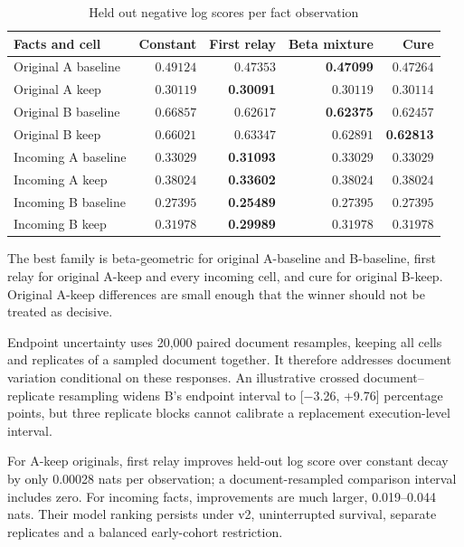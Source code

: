 \documentclass[10pt,letterpaper]{amsart}
\numberwithin{equation}{section}
\begin{document}
\begin{table}[!htbp]
  \centering
  \small
  \caption{Held out negative log scores per fact observation}
  \label{tab:predictive-comparison}
  \begin{tabular}{@{}lrrrr@{}}
    \toprule
    \textbf{Facts and cell} & \textbf{Constant} & \textbf{First relay} & \textbf{Beta mixture} & \textbf{Cure} \\
    \midrule
    Original A baseline & $0.49124$ & $0.47353$ & \textbf{0.47099} & $0.47264$ \\
    Original A keep & $0.30119$ & \textbf{0.30091} & $0.30119$ & $0.30114$ \\
    Original B baseline & $0.66857$ & $0.62617$ & \textbf{0.62375} & $0.62457$ \\
    Original B keep & $0.66021$ & $0.63347$ & $0.62891$ & \textbf{0.62813} \\
    Incoming A baseline & $0.33029$ & \textbf{0.31093} & $0.33029$ & $0.33029$ \\
    Incoming A keep & $0.38024$ & \textbf{0.33602} & $0.38024$ & $0.38024$ \\
    Incoming B baseline & $0.27395$ & \textbf{0.25489} & $0.27395$ & $0.27395$ \\
    Incoming B keep & $0.31978$ & \textbf{0.29989} & $0.31978$ & $0.31978$ \\
    \bottomrule
  \end{tabular}
\end{table}

The best family is beta-geometric for original A-baseline and B-baseline, first relay for
original A-keep and every incoming cell, and cure for original B-keep. Original A-keep
differences are small enough that the winner should not be treated as decisive.

Endpoint uncertainty uses 20,000 paired document resamples, keeping all cells and
replicates of a sampled document together. It therefore addresses document variation
conditional on these responses. An illustrative crossed document--replicate resampling
widens B's endpoint interval to [\ensuremath{-}3.26, +9.76] percentage points, but three
replicate blocks cannot calibrate a replacement execution-level interval.

For A-keep originals, first relay improves held-out log score over constant decay by only
0.00028 nats per observation; a document-resampled comparison interval includes zero. For
incoming facts, improvements are much larger, 0.019--0.044 nats. Their model ranking
persists under v2, uninterrupted survival, separate replicates and a balanced early-cohort
restriction.
\end{document}
